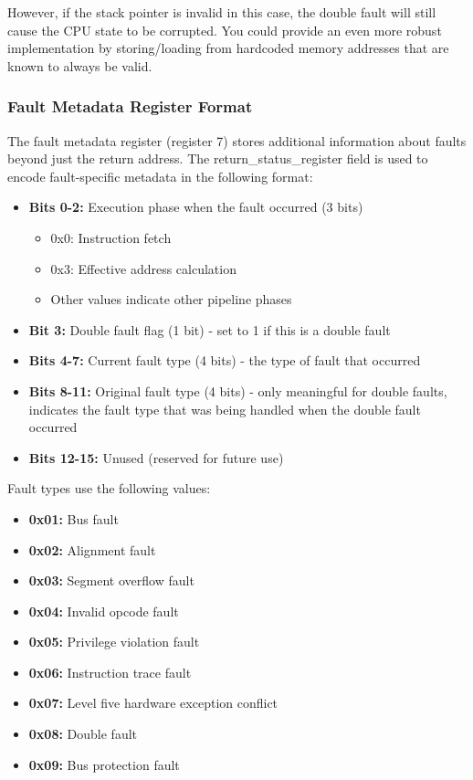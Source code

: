 However, if the stack pointer is invalid in this case, the double fault will still cause the CPU state to be corrupted.
You could provide an even more robust implementation by storing/loading from hardcoded memory addresses that are known
to always be valid.

\subsubsection{Fault Metadata Register Format}
\label{sec:fault-metadata-register-format}

The fault metadata register (register 7) stores additional information about faults beyond just the return address. The
return\_status\_register field is used to encode fault-specific metadata in the following format:

\begin{itemize}
	\item \textbf{Bits 0-2:} Execution phase when the fault occurred (3 bits)
	      \begin{itemize}
		      \item 0x0: Instruction fetch
		      \item 0x3: Effective address calculation
		      \item Other values indicate other pipeline phases
	      \end{itemize}
	\item \textbf{Bit 3:} Double fault flag (1 bit) - set to 1 if this is a double fault
	\item \textbf{Bits 4-7:} Current fault type (4 bits) - the type of fault that occurred
	\item \textbf{Bits 8-11:} Original fault type (4 bits) - only meaningful for double faults, indicates the fault type
	      that was being handled when the double fault occurred
	\item \textbf{Bits 12-15:} Unused (reserved for future use)
\end{itemize}

Fault types use the following values:

\begin{itemize}
	\item \textbf{0x01:} Bus fault
	\item \textbf{0x02:} Alignment fault
	\item \textbf{0x03:} Segment overflow fault
	\item \textbf{0x04:} Invalid opcode fault
	\item \textbf{0x05:} Privilege violation fault
	\item \textbf{0x06:} Instruction trace fault
	\item \textbf{0x07:} Level five hardware exception conflict
	\item \textbf{0x08:} Double fault
	\item \textbf{0x09:} Bus protection fault
\end{itemize}

